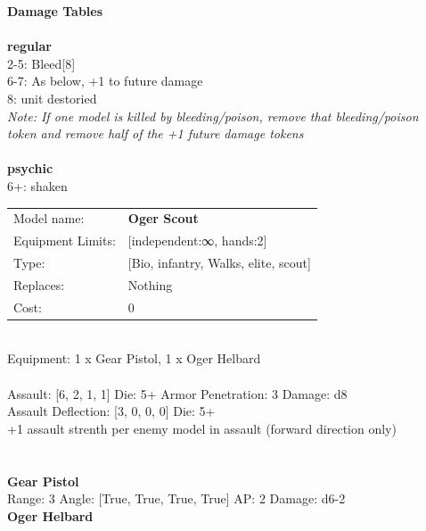 {\bf Damage Tables} \\
\ \\ {\bf regular } \\
2-5: Bleed[8] \\
6-7: As below, +1 to future damage \\
8: unit destoried \\
{{\it Note: If one model is killed by bleeding/poison, remove that bleeding/poison \\ token and remove half of the +1 future damage tokens}} \\
\ \\ {\bf psychic } \\
6+: shaken \\


\noindent
\begin{tabular}{ll}
Model name: &{\bf Oger Scout } \\
Equipment Limits: &[independent:∞, hands:2] \\
Type: &[Bio, infantry, Walks, elite, scout] \\
Replaces: &Nothing \\
Cost: & 0\\
\end{tabular}
\ \\
Equipment: 1 x Gear Pistol, 1 x Oger Helbard \\
\ \\
Assault: [6, 2, 1, 1] Die: 5+ Armor Penetration: 3 Damage: d8 \\
Assault Deflection: [3, 0, 0, 0] Die: 5+\\
\indent +1 assault strenth per enemy model in assault (forward direction only)\\ 
 
\ \\

\ \\
{\bf Gear Pistol } \\



Range: 3  Angle: [True, True, True, True] AP: 2 Damage: d6-2 \\




{\bf Oger Helbard } \\






 
\ \\













